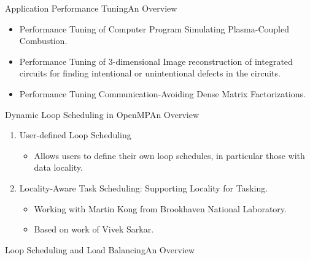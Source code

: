 
\begin{frame}[label=apptuningovw]{Application Performance Tuning}{An Overview}
\begin{itemize}
    \item Performance Tuning of Computer Program Simulating Plasma-Coupled Combustion.
    \item Performance Tuning of 3-dimensional Image reconstruction of integrated circuits for finding intentional or unintentional defects in the circuits.
    \item Performance Tuning Communication-Avoiding Dense Matrix Factorizations. 
\end{itemize}
\end{frame}




\begin{frame}[label=dynworkovw]{Dynamic Loop Scheduling in OpenMP}{An Overview}
\begin{enumerate}
\item User-defined Loop Scheduling
\begin{itemize}
\item Allows users to define their own loop schedules, in particular those with data locality.
\end{itemize}
\item Locality-Aware Task Scheduling: Supporting Locality for Tasking.
\begin{itemize}
\item \small Working with Martin Kong from Brookhaven National Laboratory.
\item \small Based on work of Vivek Sarkar.
\end{itemize}
\end{enumerate}
\end{frame}





\begin{frame}[label=lslbovw]{Loop Scheduling and Load Balancing}{An Overview}

\end{frame}

